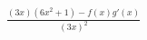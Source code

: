 \documentclass[preview]{standalone}
\begin{document}
\begin{align*}
\frac{(3x)(6x^2+1)-f(x)g'(x)}{(3x)^2}
\end{align*}
\end{document}
